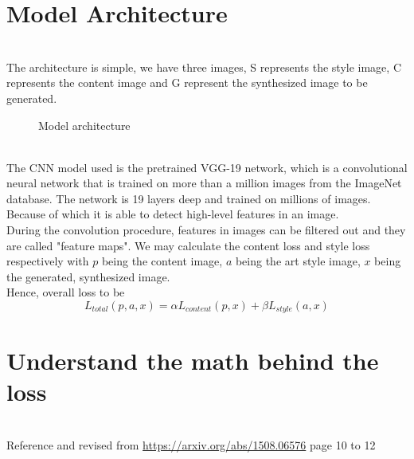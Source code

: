 \documentclass[11pt, a4paper]{article} %
\begin{document}
\section{Model Architecture}
\\ The architecture is simple, we have three images, S represents the style image, C represents the content image and G represent the synthesized image to be generated.
\begin{figure}[H]
    \centering
    \caption{Model architecture}
\end{figure}
\\ The CNN model used is the pretrained VGG-19 network, which is a convolutional neural network that is trained on more than a million images from the ImageNet database. The network is 19 layers deep and trained on millions of images. Because of which it is able to detect high-level features in an image. 
\\ During the convolution procedure, features in images can be filtered out and they are called "feature maps". We may calculate the content loss and style loss respectively with $p$ being the content image, $a$ being the art style image, $x$ being the generated, synthesized image. 
\\ Hence, overall loss to be {\Large $$L_{total}(p, a, x) = \alpha L_{content}(p, x) + \beta L_{style}(a, x)$$}
\section{Understand the math behind the loss}
\\ Reference and revised from \url{https://arxiv.org/abs/1508.06576} page 10 to 12
\end{document}
